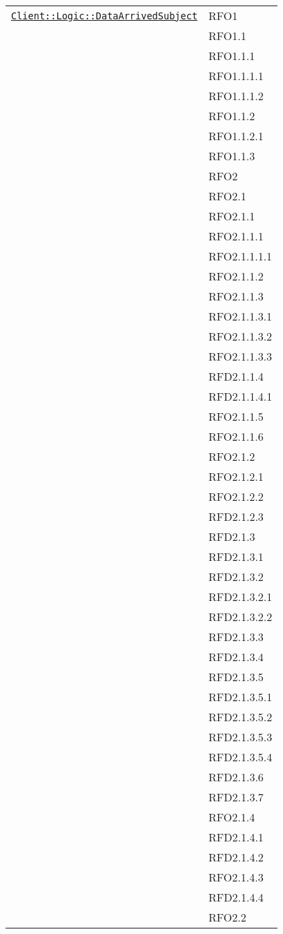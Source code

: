 \begin{longtable}{|>{\centering}m{10cm}|m{3cm}<{\centering}|}
\hyperref[Client::Logic::DataArrivedSubject]{\texttt{Client::Logic::DataArrivedSubject}} & RFO1\\
& RFO1.1\\
& RFO1.1.1\\
& RFO1.1.1.1\\
& RFO1.1.1.2\\
& RFO1.1.2\\
& RFO1.1.2.1\\
& RFO1.1.3\\
& RFO2\\
& RFO2.1\\
& RFO2.1.1\\
& RFO2.1.1.1\\
& RFO2.1.1.1.1\\
& RFO2.1.1.2\\
& RFO2.1.1.3\\
& RFO2.1.1.3.1\\
& RFO2.1.1.3.2\\
& RFO2.1.1.3.3\\
& RFD2.1.1.4\\
& RFD2.1.1.4.1\\
& RFO2.1.1.5\\
& RFO2.1.1.6\\
& RFO2.1.2\\
& RFO2.1.2.1\\
& RFO2.1.2.2\\
& RFD2.1.2.3\\
& RFD2.1.3\\
& RFD2.1.3.1\\
& RFD2.1.3.2\\
& RFD2.1.3.2.1\\
& RFD2.1.3.2.2\\
& RFD2.1.3.3\\
& RFD2.1.3.4\\
& RFD2.1.3.5\\
& RFD2.1.3.5.1\\
& RFD2.1.3.5.2\\
& RFD2.1.3.5.3\\
& RFD2.1.3.5.4\\
& RFD2.1.3.6\\
& RFD2.1.3.7\\
& RFO2.1.4\\
& RFD2.1.4.1\\
& RFD2.1.4.2\\
& RFO2.1.4.3\\
& RFD2.1.4.4\\
& RFO2.2\\

\end{longtable}
